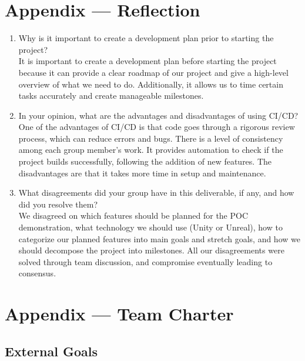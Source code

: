 \documentclass{article}
\begin{document}
\section*{Appendix --- Reflection}



\begin{enumerate}
    \item Why is it important to create a development plan prior to starting the
    project? \\
    
    It is important to create a development plan before starting the project because it can provide a clear roadmap of our project and give a high-level overview of what we need to do. Additionally, it allows us to time certain tasks accurately and create manageable milestones.

    \item In your opinion, what are the advantages and disadvantages of using
    CI/CD? \\

    One of the advantages of CI/CD is that code goes through a rigorous review process, which can reduce errors and bugs. There is a level of consistency among each group member’s work. It provides automation to check if the project builds successfully, following the addition of new features. The disadvantages are that it takes more time in setup and maintenance. 
    
    \item What disagreements did your group have in this deliverable, if any,
    and how did you resolve them? \\

    We disagreed on which features should be planned for the POC demonstration, what technology we should use (Unity or Unreal), how to categorize our planned features into main goals and stretch goals, and how we should decompose the project into milestones. All our disagreements were solved through team discussion, and compromise eventually leading to consensus.
\end{enumerate}

\newpage{}

\section*{Appendix --- Team Charter}

\subsection*{External Goals}
\end{document}
